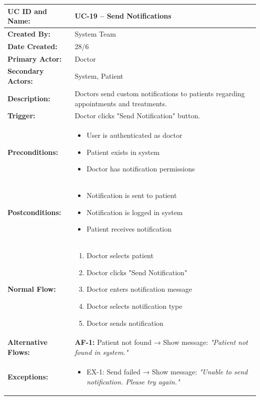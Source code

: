 \documentclass[12pt,a4paper]{article}
\begin{document}
\renewcommand{\arraystretch}{1.5}
\begin{longtable}{|p{4.5cm}|p{10.5cm}|}
\hline
\textbf{UC ID and Name:} & UC-19 – Send Notifications \\
\hline
\textbf{Created By:} & System Team \\
\hline
\textbf{Date Created:} & 28/6 \\
\hline
\textbf{Primary Actor:} & Doctor \\
\hline
\textbf{Secondary Actors:} & System, Patient \\
\hline
\textbf{Description:} & Doctors send custom notifications to patients regarding appointments and treatments. \\
\hline
\textbf{Trigger:} & Doctor clicks "Send Notification" button. \\
\hline
\textbf{Preconditions:} &
\begin{itemize}
  \item User is authenticated as doctor
  \item Patient exists in system
  \item Doctor has notification permissions
\end{itemize} \\
\hline
\textbf{Postconditions:} &
\begin{itemize}
  \item Notification is sent to patient
  \item Notification is logged in system
  \item Patient receives notification
\end{itemize} \\
\hline
\textbf{Normal Flow:} &
\begin{enumerate}
  \item Doctor selects patient
  \item Doctor clicks "Send Notification"
  \item Doctor enters notification message
  \item Doctor selects notification type
  \item Doctor sends notification
\end{enumerate} \\
\hline
\textbf{Alternative Flows:} &
\textbf{AF-1:} Patient not found → Show message: \textit{"Patient not found in system."} \\
\hline
\textbf{Exceptions:} &
\begin{itemize}
  \item EX-1: Send failed → Show message: \textit{"Unable to send notification. Please try again."}

\end{itemize}
\end{longtable}
\end{document}
